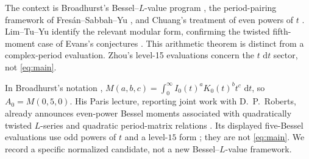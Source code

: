 \documentclass[11pt]{article}
\numberwithin{equation}{section}
\theoremstyle{definition}
\theoremstyle{remark}
\newcommand{\dd}{\,\mathrm d}
\theoremstyle{plain}
\begin{document}
The context is Broadhurst's Bessel--$L$-value program \cite{Bro16,Bro17Paris},
the period-pairing framework of Fres\'an--Sabbah--Yu \cite{FSY}, and
Chuang's treatment of even powers of $t$ \cite{Chu}.
Lim--Tu--Yu \cite[Theorem~1.2.2(iii)]{LTY} identify the relevant modular form,
confirming the twisted fifth-moment case of Evans's conjectures
\cite[\S4]{Evans}. This arithmetic theorem is distinct from a complex-period
evaluation. Zhou's level-15 evaluations \cite{ZhouW} concern the
$t\,\dd t$ sector, not \eqref{eq:main}.

In Broadhurst's notation \cite[p.~4]{Bro17Paris},
$M(a,b,c)=\int_0^\infty I_0(t)^aK_0(t)^b t^c\,\dd t$, so $A_0=M(0,5,0)$.
His Paris lecture, reporting joint work with D.~P.~Roberts, already announces
even-power Bessel moments associated with quadratically twisted $L$-series
and quadratic period-matrix relations \cite[pp.~13, 15]{Bro17Paris}.
Its displayed five-Bessel evaluations use odd powers of $t$ and a
level-$15$ form \cite[\S\S2.1, 2.5]{Bro17Paris}; they are not \eqref{eq:main}.
We record a specific normalized candidate, not a new Bessel--$L$-value
framework.
\end{document}
